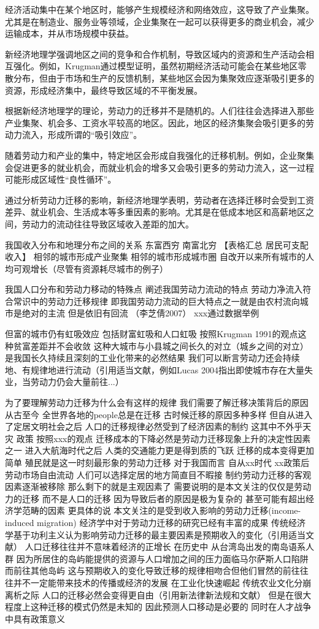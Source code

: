 \documentclass{article}
\numberwithin{equation}{section} %
\begin{document}
经济活动集中在某个地区时，能够产生规模经济和网络效应，这导致了产业集聚。尤其是在制造业、服务业等领域，企业集聚在一起可以获得更多的商业机会，减少运输成本，并从市场规模中获益。

新经济地理学强调地区之间的竞争和合作机制，导致区域内的资源和生产活动会相互强化。例如，Krugman通过模型证明，虽然初期经济活动可能会在某些地区零散分布，但由于市场和生产的反馈机制，某些地区会因为集聚效应逐渐吸引更多的资源，形成经济集中，最终导致区域的不平衡发展。

根据新经济地理学的理论，劳动力的迁移并不是随机的。人们往往会选择进入那些产业集聚、机会多、工资水平较高的地区。因此，地区的经济集聚会吸引更多的劳动力流入，形成所谓的“吸引效应”。

随着劳动力和产业的集中，特定地区会形成自我强化的迁移机制。例如，企业聚集会促进更多的就业机会，而就业机会的增多又会吸引更多的劳动力流入，这一过程可能形成区域性“良性循环”。

通过分析劳动力迁移的影响，新经济地理学表明，劳动者在选择迁移时会受到工资差异、就业机会、生活成本等多重因素的影响。尤其是在低成本地区和高薪地区之间，劳动力的流动往往导致区域收入差距的加大。

我国收入分布和地理分布之间的关系
东富西穷 南富北穷
【表格汇总 居民可支配收入】
相邻的城市形成产业聚集 相邻的城市形成城市圈 自改开以来所有城市的人均可观增长（尽管有资源耗尽城市的例子）

我国人口分布和劳动力移动的特殊点
阐述我国劳动力流动的特点
劳动力净流入符合常识中的劳动力迁移规律
即我国劳动力流动的巨大特点之一就是由农村流向城市是绝对的主流
但是依旧有回流
（李芝倩2007）
xxx通过数据举例


但富的城市仍有虹吸效应 包括财富虹吸和人口虹吸 按照Krugman 1991的观点这种贫富差距并不会收敛
这种大城市与小县城之间长久的对立（城乡之间的对立）是我国长久持续且深刻的工业化带来的必然结果 
我们可以断言劳动力还会持续地、有规律地进行流动（引用适当文献，例如Lucas 2004指出即使城市存在大量失业，当劳动力仍会大量前往...）


为了要理解劳动力迁移为什么会有这样的规律
我们需要了解迁移决策背后的原因
从古至今 全世界各地的people总是在迁移
古时候迁移的原因多种多样
但自从进入了定居文明社会之后 人口的迁移规律必然受到了经济因素的制约
这其中不外乎天灾 政策
按照xxx的观点 迁移成本的下降必然是劳动力迁移现象上升的决定性因素之一
进入大航海时代之后 人类的交通能力更是得到质的飞跃 迁移的成本变得更加简单 殖民就是这一时刻最形象的劳动力迁移
对于我国而言 自从xx时代 xx政策后 劳动市场自由流动 人们可以选择定居的地方简直目不暇接
制约劳动力迁移的客观因素逐渐被移除 那么剩下的就是主观因素了
需要说明的是本文关注的仅仅是劳动力的迁移 而不是人口的迁移 因为导致后者的原因是极为复杂的 甚至可能有超出经济学范畴的因素 更具体的说 本文关注的是受到收入影响的劳动力迁移(income-induced migration)
经济学中对于劳动力迁移的研究已经有丰富的成果
传统经济学基于功利主义认为影响劳动力迁移的最主要因素是预期收入的变化（引用适当文献）
人口迁移往往并不意味着经济的正增长 在历史中 从台湾岛出发的南岛语系人群 因为所居住的岛屿能提供的资源与人口增加之间的压力面临马尔萨斯人口陷阱而前往其他岛屿 这与预期收入的变化导致迁移的规律相吻合但他们冒然的前往往往并不一定能带来技术的传播或经济的发展
在工业化快速崛起 传统农业文化分崩离析之际 人口的迁移必然会变得更自由（引用新法律新法规和文献） 但是在很大程度上这种迁移的模式仍然是未知的 因此预测人口移动是必要的
同时在人才战争中具有政策意义 
\end{document}
